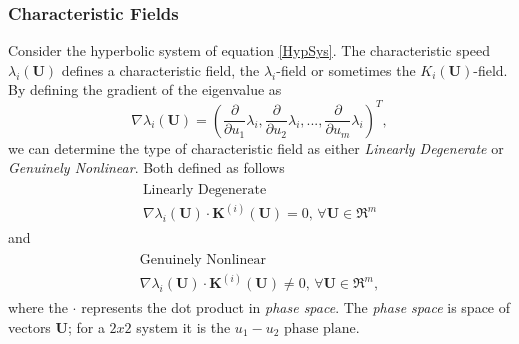 \documentclass[]{article}
\begin{document}
		\subsubsection{Characteristic Fields}
			Consider the hyperbolic system of equation \ref{HypSys}. The characteristic speed $ \lambda_i(\textbf{U}) $ defines a characteristic field, the $ \lambda_i $-field or sometimes the $ K_i(\textbf{U}) $-field. By defining the gradient of the eigenvalue as
			\begin{equation}
				\nabla \lambda_i(\textbf{U}) = (\frac{\partial}{\partial u_1}\lambda_i, \frac{\partial}{\partial u_2}\lambda_i,..., \frac{\partial}{\partial u_m}\lambda_i)^T,
			\end{equation}
			we can determine the type of characteristic field as either \textit{Linearly Degenerate} or \textit{Genuinely Nonlinear}. Both defined as follows
			\begin{equation}
				\begin{aligned}
					\begin{array}{ll}
						\mbox{Linearly Degenerate} \\
						\nabla \lambda_i(\textbf{U}) \cdot \textbf{K}^{(i)}(\textbf{U}) = 0 \mbox{, } \forall\textbf{U} \in \Re^m
					\end{array}
				\end{aligned}			
			\end{equation}
			and
			\begin{equation} 
				\begin{aligned}
					\begin{array}{ll}
						\mbox{Genuinely Nonlinear} \\
						\nabla \lambda_i(\textbf{U}) \cdot \textbf{K}^{(i)}(\textbf{U}) \ne 0 \mbox{, } \forall\textbf{U} \in \Re^m,
					\end{array}
				\end{aligned}			
			\end{equation}
			where the $ \cdot $ represents the dot product in \textit{phase space}. The \textit{phase space} is space of vectors $ \textbf{U} $; for a $ 2x2 $ system it is the $ u_1-u_2 \mbox{ phase plane}$.
		
\end{document}
